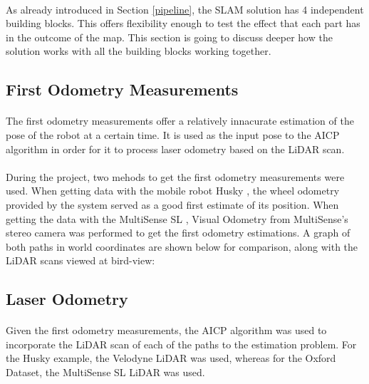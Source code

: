 \documentclass[11pt]{article}
\begin{document}
	\paragraph{}
	As already introduced in Section \ref{pipeline}, the SLAM solution has 4 independent building blocks. This offers flexibility enough to test the effect that each part has in the outcome of the map. This section is going to discuss deeper how the solution works with all the building blocks working together. 
	 
	\subsection{First Odometry Measurements}
	\paragraph{}
	The first odometry measurements offer a relatively innacurate estimation of the pose of the robot at a certain time. It is used as the input pose to the AICP algorithm in order for it to process laser odometry based on the LiDAR scan.
	
	\paragraph{}
	During the project, two mehods to get the first odometry measurements were used. When getting data with the mobile robot Husky \cite{Husky}, the wheel odometry provided by the system served as a good first estimate of its position. When getting the data with the MultiSense SL \cite{multisense}, Visual Odometry from MultiSense's stereo camera was performed to get the first odometry estimations. 
	A graph of both paths in world coordinates are shown below for comparison, along with the LiDAR scans viewed at bird-view:
	
	\subsection{Laser Odometry}
	\paragraph{}
	Given the first odometry measurements, the AICP algorithm was used to incorporate the LiDAR scan of each of the paths to the estimation problem. For the Husky example, the Velodyne \cite{velodyne} LiDAR was used, whereas for the Oxford Dataset, the MultiSense SL LiDAR was used.
	
\end{document}
